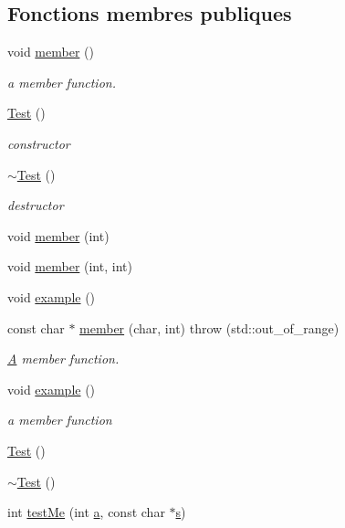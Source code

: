 \subsection*{Fonctions membres publiques}
\begin{DoxyCompactItemize}
\item 
void \hyperlink{class_test_a703997077e40c222687a0ea2973a9ea1}{member} ()
\begin{DoxyCompactList}\small\item\em a member function. \end{DoxyCompactList}\item 
\hyperlink{class_test_a44e3a28c552193de099601e2910531f1}{Test} ()
\begin{DoxyCompactList}\small\item\em constructor \end{DoxyCompactList}\item 
\hyperlink{class_test_a31b169208ad4fc5344a7b6b8e1fd00c1}{$\sim$\+Test} ()
\begin{DoxyCompactList}\small\item\em destructor \end{DoxyCompactList}\item 
void \hyperlink{class_test_ac2f90eeb597ab8382dcdfcdf1df720f1}{member} (int)
\item 
void \hyperlink{class_test_aea163a1016f022bdb9e4acc3a32fa3eb}{member} (int, int)
\item 
void \hyperlink{class_test_a219565a812ad07b6517d74bdb36711ea}{example} ()
\item 
const char $\ast$ \hyperlink{class_test_a8a2453fcd30504975daa648a70a4e99e}{member} (char, int)  throw (std\+::out\+\_\+of\+\_\+range)
\begin{DoxyCompactList}\small\item\em \hyperlink{class_a}{A} member function. \end{DoxyCompactList}\item 
void \hyperlink{class_test_a219565a812ad07b6517d74bdb36711ea}{example} ()
\begin{DoxyCompactList}\small\item\em a member function \end{DoxyCompactList}\item 
\hyperlink{class_test_a44e3a28c552193de099601e2910531f1}{Test} ()
\item 
\hyperlink{class_test_a31b169208ad4fc5344a7b6b8e1fd00c1}{$\sim$\+Test} ()
\item 
int \hyperlink{class_test_ab89e4a0d841b51185817c5c7ae739ea4}{test\+Me} (int \hyperlink{060__command__switch_8tcl_ab08ae027fc5777bc4f0629f1b60b35db}{a}, const char $\ast$\hyperlink{060__command__switch_8tcl_a011c73f2dbb87635a3b4206c72355f6e}{s})

\end{DoxyCompactItemize}
